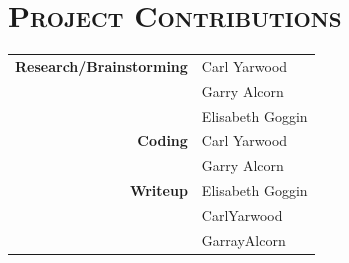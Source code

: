 \documentclass[12pt]{article}
\begin{document}
	\section[Project Contributions]{\Large{}\selectfont\scshape Project Contributions}
	
	\begin{center}
		{\scshape\small
		\begin{tabular}{r l}
			\bfseries Research/Brainstorming & Carl Yarwood\\
			& Garry Alcorn\\
			& Elisabeth Goggin\\
			\bfseries Coding & Carl Yarwood\\
			& Garry Alcorn\\
			\bfseries Writeup & Elisabeth Goggin \\
                        & CarlYarwood \\
                        & GarrayAlcorn\\
		\end{tabular}
		}
	\end{center}
	
\end{document}
